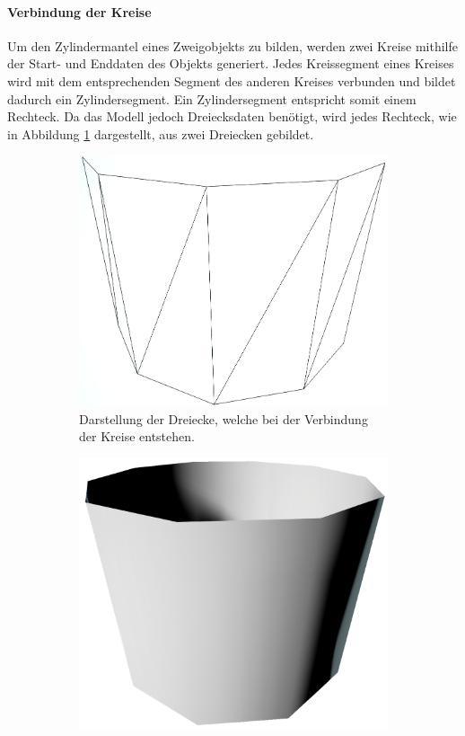 \paragraph{Verbindung der Kreise}
Um den Zylindermantel eines Zweigobjekts zu bilden, werden zwei Kreise mithilfe der Start- und Enddaten des Objekts generiert. Jedes Kreissegment eines Kreises wird mit dem entsprechenden Segment des anderen Kreises verbunden und bildet dadurch ein Zylindersegment. Ein Zylindersegment entspricht somit einem Rechteck. Da das Modell jedoch Dreiecksdaten benötigt, wird jedes Rechteck, wie in Abbildung \ref{subfig:Zylinder10SegmenteWireframe} dargestellt, aus zwei Dreiecken gebildet. \cite{ModelingByNumbersZylindersA:13}
\begin{figure} [hbtp]
\centering
\begin{subfigure}[t]{.4\textwidth}
	\centering
	\includegraphics[height=.75\linewidth]{images/Zylinder10SegmenteWireframe.png}
	\caption{Darstellung der Dreiecke, welche bei der Verbindung der Kreise entstehen.}
	\label{subfig:Zylinder10SegmenteWireframe}
\end{subfigure}
\hspace{.1\textwidth}
\begin{subfigure}[t]{.4\textwidth}
	\centering
	\includegraphics[height=.75\linewidth]{images/Zylinder10SegmenteOpaque.png}

\end{subfigure}
\end{figure}
